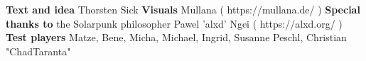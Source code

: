 \newpage
\begin{center}
\textbf{Text and idea}
\newline
Thorsten Sick
\newline
\textbf{Visuals}
\newline
Mullana ( https://mullana.de/ )
\newline
\textbf{Special thanks to}
\newline
the Solarpunk philosopher Pawel 'alxd' Ngei ( https://alxd.org/ )
\newline
\textbf{Test players}
\newline
Matze, Bene, Micha, Michael, Ingrid, Susanne Peschl, Christian "ChadTaranta"
\newline
\end{center}
\newpage